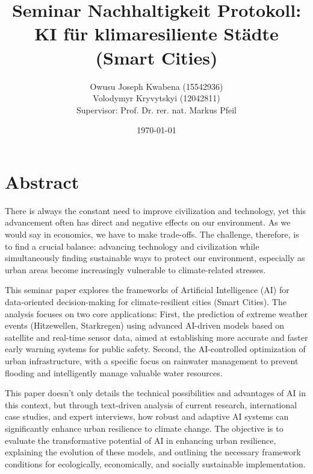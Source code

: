 \documentclass[12pt]{article}
\begin{document}
\title{Seminar Nachhaltigkeit Protokoll: KI für klimaresiliente Städte (Smart Cities)}
\author{Owusu Joseph Kwabena (15542936)\\[1ex]
Volodymyr Kryvytskyi (12042811)\\[1ex]
Supervisor: Prof. Dr. rer. nat. Markus Pfeil}
\date{\today} %

\maketitle

\tableofcontents
\setcounter{page}{1} %

\section{Abstract}
There is always the constant need to improve civilization and technology, yet this advancement 
often has direct and negative effects on our environment. As we would say in economics, 
we have to make trade-offs. The challenge, therefore, is to find a crucial balance: advancing 
technology and civilization while simultaneously finding sustainable ways to protect our environment, 
especially as urban areas become increasingly vulnerable to climate-related stresses.

This seminar paper explores the frameworks of Artificial Intelligence (AI) for data-oriented 
decision-making for climate-resilient cities (Smart Cities). The analysis focuses on two core 
applications: First, the prediction of extreme weather events (Hitzewellen, Starkregen) using 
advanced AI-driven models based on satellite and real-time sensor data, aimed at establishing 
more accurate and faster early warning systems for public safety. Second, the AI-controlled 
optimization of urban infrastructure, with a specific focus on rainwater management 
to prevent flooding and intelligently manage valuable water resources.

This paper doesn't only details the technical possibilities and advantages of AI in this 
context, but through text-driven analysis of current research, international case studies, 
and expert interviews, how robust and adaptive AI systems can significantly enhance urban 
resilience to climate change. The objective is to evaluate the transformative potential of AI 
in enhancing urban resilience, explaining the evolution of these models, and outlining the necessary 
framework conditions for ecologically, economically, and socially sustainable implementation.
\end{document}
